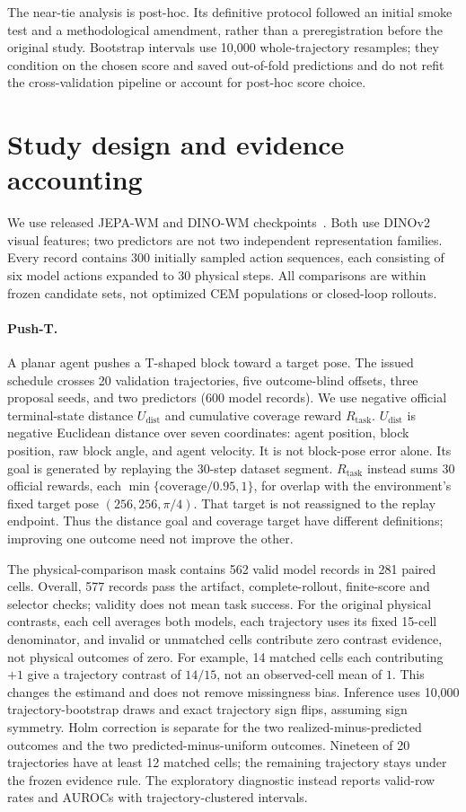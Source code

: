 \documentclass{article}
\begin{document}
The near-tie analysis is post-hoc. Its definitive protocol followed an initial
smoke test and a methodological amendment, rather than a preregistration before
the original study. Bootstrap intervals use 10,000 whole-trajectory resamples;
they condition on the chosen score and saved out-of-fold predictions and do
not refit the cross-validation pipeline or account for post-hoc score choice.

\section{Study design and evidence accounting}

We use released JEPA-WM and DINO-WM checkpoints~\citep{terver2026drives,pmlr-v267-zhou25t}.
Both use DINOv2 visual features; two predictors are not two independent
representation families. Every record contains 300 initially sampled action sequences,
each consisting of six model actions expanded to 30 physical steps. All
comparisons are within frozen candidate sets, not optimized CEM populations or
closed-loop rollouts.

\paragraph{Push-T.}
A planar agent pushes a T-shaped block toward a target pose. The issued
schedule crosses 20 validation trajectories, five outcome-blind offsets,
three proposal seeds, and two predictors (600 model records). We use negative
official terminal-state distance $U_{\mathrm{dist}}$ and cumulative coverage reward $R_{\mathrm{task}}$.
$U_{\mathrm{dist}}$ is negative Euclidean distance over seven coordinates: agent position, block
position, raw block angle, and agent velocity. It is not block-pose error
alone. Its goal is generated by replaying the 30-step dataset segment.
$R_{\mathrm{task}}$ instead sums 30 official rewards, each
$\min\{\mathrm{coverage}/0.95,1\}$, for overlap with the environment's fixed
target pose $(256,256,\pi/4)$. That target is not reassigned to the replay
endpoint. Thus the distance goal and coverage target have different
definitions; improving one outcome need not improve the other.

The physical-comparison mask contains 562 valid model records in 281 paired
cells. Overall, 577 records pass the artifact, complete-rollout, finite-score
and selector checks; validity does not mean task success. For the original physical contrasts, each cell
averages both models, each trajectory uses its fixed 15-cell denominator,
and invalid or unmatched cells contribute zero contrast evidence, not physical
outcomes of zero. For example, 14 matched cells each contributing $+1$ give a
trajectory contrast of $14/15$, not an observed-cell mean of $1$. This changes
the estimand and does not remove missingness bias. Inference uses 10,000 trajectory-bootstrap draws and exact
trajectory sign flips, assuming sign symmetry. Holm correction is separate
for the two realized-minus-predicted outcomes and the two
predicted-minus-uniform outcomes. Nineteen of
20 trajectories have at least 12 matched cells; the remaining trajectory stays
under the frozen evidence rule. The exploratory diagnostic instead reports
valid-row rates and AUROCs with trajectory-clustered intervals.
\end{document}
